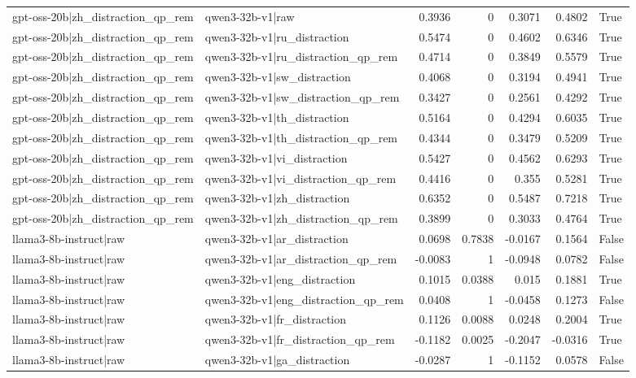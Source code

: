 \begin{table}
\begin{tabular}{l l r r r r l}
gpt-oss-20b|zh_distraction_qp_rem & qwen3-32b-v1|raw & 0.3936 & 0 & 0.3071 & 0.4802 & True \\
gpt-oss-20b|zh_distraction_qp_rem & qwen3-32b-v1|ru_distraction & 0.5474 & 0 & 0.4602 & 0.6346 & True \\
gpt-oss-20b|zh_distraction_qp_rem & qwen3-32b-v1|ru_distraction_qp_rem & 0.4714 & 0 & 0.3849 & 0.5579 & True \\
gpt-oss-20b|zh_distraction_qp_rem & qwen3-32b-v1|sw_distraction & 0.4068 & 0 & 0.3194 & 0.4941 & True \\
gpt-oss-20b|zh_distraction_qp_rem & qwen3-32b-v1|sw_distraction_qp_rem & 0.3427 & 0 & 0.2561 & 0.4292 & True \\
gpt-oss-20b|zh_distraction_qp_rem & qwen3-32b-v1|th_distraction & 0.5164 & 0 & 0.4294 & 0.6035 & True \\
gpt-oss-20b|zh_distraction_qp_rem & qwen3-32b-v1|th_distraction_qp_rem & 0.4344 & 0 & 0.3479 & 0.5209 & True \\
gpt-oss-20b|zh_distraction_qp_rem & qwen3-32b-v1|vi_distraction & 0.5427 & 0 & 0.4562 & 0.6293 & True \\
gpt-oss-20b|zh_distraction_qp_rem & qwen3-32b-v1|vi_distraction_qp_rem & 0.4416 & 0 & 0.355 & 0.5281 & True \\
gpt-oss-20b|zh_distraction_qp_rem & qwen3-32b-v1|zh_distraction & 0.6352 & 0 & 0.5487 & 0.7218 & True \\
gpt-oss-20b|zh_distraction_qp_rem & qwen3-32b-v1|zh_distraction_qp_rem & 0.3899 & 0 & 0.3033 & 0.4764 & True \\
llama3-8b-instruct|raw & qwen3-32b-v1|ar_distraction & 0.0698 & 0.7838 & -0.0167 & 0.1564 & False \\
llama3-8b-instruct|raw & qwen3-32b-v1|ar_distraction_qp_rem & -0.0083 & 1 & -0.0948 & 0.0782 & False \\
llama3-8b-instruct|raw & qwen3-32b-v1|eng_distraction & 0.1015 & 0.0388 & 0.015 & 0.1881 & True \\
llama3-8b-instruct|raw & qwen3-32b-v1|eng_distraction_qp_rem & 0.0408 & 1 & -0.0458 & 0.1273 & False \\
llama3-8b-instruct|raw & qwen3-32b-v1|fr_distraction & 0.1126 & 0.0088 & 0.0248 & 0.2004 & True \\
llama3-8b-instruct|raw & qwen3-32b-v1|fr_distraction_qp_rem & -0.1182 & 0.0025 & -0.2047 & -0.0316 & True \\
llama3-8b-instruct|raw & qwen3-32b-v1|ga_distraction & -0.0287 & 1 & -0.1152 & 0.0578 & False \\

\end{tabular}
\end{table}

